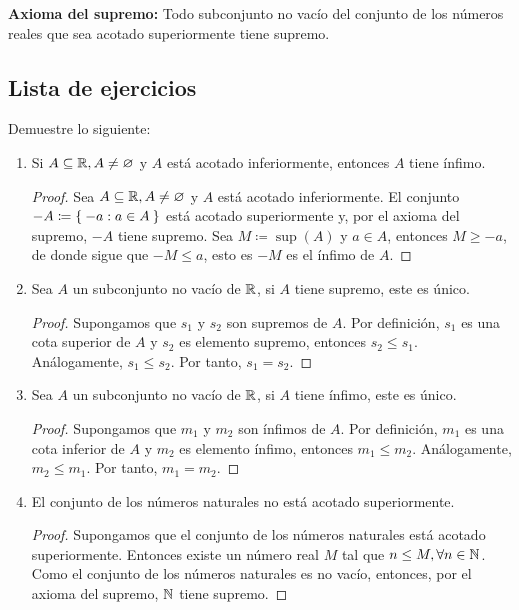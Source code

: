 \textbf{Axioma del supremo:} Todo subconjunto no vacío del conjunto de los números reales que sea acotado superiormente tiene supremo.

\subsection*{Lista de ejercicios}

Demuestre lo siguiente:

\begin{enumerate}[label=\alph*)]
  \item Si $A\subseteq \mathbb{R}, A\neq \varnothing$ y $A$ está acotado inferiormente, entonces $A$ tiene ínfimo.
  \begin{proof}\leavevmode
    Sea $A\subseteq \mathbb{R}, A\neq \varnothing$ y $A$ está acotado inferiormente. El conjunto $-A \coloneqq \Set{-a: a\in A}$ está acotado superiormente y, por el axioma del supremo, $-A$ tiene supremo. Sea $M\coloneqq \sup{(A)}$ y $a\in A$, entonces $M\geq -a$, de donde sigue que $-M\leq a$, esto es $-M$ es el ínfimo de $A$.
  \end{proof}
  
  \item Sea $A$ un subconjunto no vacío de $\mathbb{R}$, si $A$ tiene supremo, este es único.
 
  \begin{proof} 
   Supongamos que $s_1$ y $s_2$ son supremos de $A$. Por definición, $s_1$ es una cota superior de $A$ y $s_2$ es elemento supremo, entonces $s_2\leq s_1$. Análogamente, $s_1\leq s_2$. Por tanto, $s_1=s_2$.
  \end{proof}
 
  \item Sea $A$ un subconjunto no vacío de $\mathbb{R}$, si $A$ tiene ínfimo, este es único.
  
  \begin{proof} 
   Supongamos que $m_1$ y $m_2$ son ínfimos de $A$. Por definición, $m_1$ es una cota inferior de $A$ y $m_2$ es elemento ínfimo, entonces $m_1\leq m_2$. Análogamente, $m_2\leq m_1$. Por tanto, $m_1=m_2$. 
  \end{proof}
  
  \item El conjunto de los números naturales no está acotado superiormente.
  \begin{proof}\leavevmode
    Supongamos que el conjunto de los números naturales está acotado superiormente. Entonces existe un número real $M$ tal que $n\leq M, \forall n\in \mathbb{N}$. Como el conjunto de los números naturales es no vacío, entonces, por el axioma del supremo, $\mathbb{N}$ tiene supremo.


\end{proof}
\end{enumerate}
